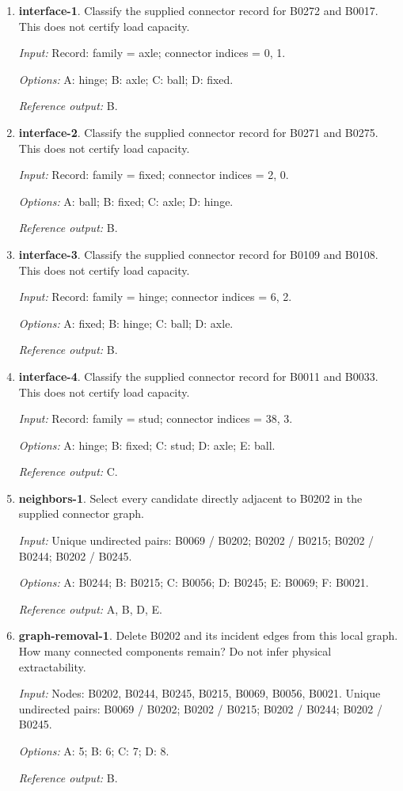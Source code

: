 \begin{enumerate}
\item \textbf{interface-1}. Classify the supplied connector record for B0272 and B0017. This does not certify load capacity.\par {\small \textit{Input:} Record: family = axle; connector indices = 0, 1. \par\textit{Options:} A: hinge; B: axle; C: ball; D: fixed. \par\textit{Reference output:} B.}
\item \textbf{interface-2}. Classify the supplied connector record for B0271 and B0275. This does not certify load capacity.\par {\small \textit{Input:} Record: family = fixed; connector indices = 2, 0. \par\textit{Options:} A: ball; B: fixed; C: axle; D: hinge. \par\textit{Reference output:} B.}
\item \textbf{interface-3}. Classify the supplied connector record for B0109 and B0108. This does not certify load capacity.\par {\small \textit{Input:} Record: family = hinge; connector indices = 6, 2. \par\textit{Options:} A: fixed; B: hinge; C: ball; D: axle. \par\textit{Reference output:} B.}
\item \textbf{interface-4}. Classify the supplied connector record for B0011 and B0033. This does not certify load capacity.\par {\small \textit{Input:} Record: family = stud; connector indices = 38, 3. \par\textit{Options:} A: hinge; B: fixed; C: stud; D: axle; E: ball. \par\textit{Reference output:} C.}
\item \textbf{neighbors-1}. Select every candidate directly adjacent to B0202 in the supplied connector graph.\par {\small \textit{Input:} Unique undirected pairs: B0069 / B0202; B0202 / B0215; B0202 / B0244; B0202 / B0245. \par\textit{Options:} A: B0244; B: B0215; C: B0056; D: B0245; E: B0069; F: B0021. \par\textit{Reference output:} A, B, D, E.}
\item \textbf{graph-removal-1}. Delete B0202 and its incident edges from this local graph. How many connected components remain? Do not infer physical extractability.\par {\small \textit{Input:} Nodes: B0202, B0244, B0245, B0215, B0069, B0056, B0021. Unique undirected pairs: B0069 / B0202; B0202 / B0215; B0202 / B0244; B0202 / B0245. \par\textit{Options:} A: 5; B: 6; C: 7; D: 8. \par\textit{Reference output:} B.}

\end{enumerate}
